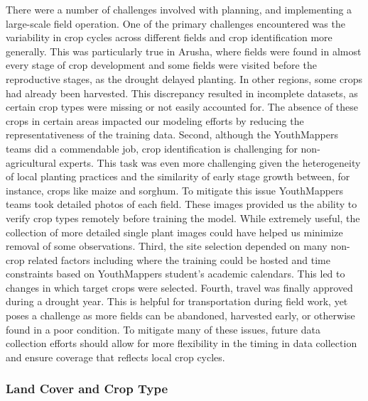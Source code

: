 \documentclass[
  journal,
  twocolumn]{IEEEtran}
\begin{document}
There were a number of challenges involved with planning, and
implementing a large-scale field operation. One of the primary
challenges encountered was the variability in crop cycles across
different fields and crop identification more generally. This was
particularly true in Arusha, where fields were found in almost every
stage of crop development and some fields were visited before the
reproductive stages, as the drought delayed planting. In other regions,
some crops had already been harvested. This discrepancy resulted in
incomplete datasets, as certain crop types were missing or not easily
accounted for. The absence of these crops in certain areas impacted our
modeling efforts by reducing the representativeness of the training
data. Second, although the YouthMappers teams did a commendable job,
crop identification is challenging for non-agricultural experts. This
task was even more challenging given the heterogeneity of local planting
practices and the similarity of early stage growth between, for
instance, crops like maize and sorghum. To mitigate this issue
YouthMappers teams took detailed photos of each field. These images
provided us the ability to verify crop types remotely before training
the model. While extremely useful, the collection of more detailed
single plant images could have helped us minimize removal of some
observations. Third, the site selection depended on many non-crop
related factors including where the training could be hosted and time
constraints based on YouthMappers student's academic calendars. This led
to changes in which target crops were selected. Fourth, travel was
finally approved during a drought year. This is helpful for
transportation during field work, yet poses a challenge as more fields
can be abandoned, harvested early, or otherwise found in a poor
condition. To mitigate many of these issues, future data collection
efforts should allow for more flexibility in the timing in data
collection and ensure coverage that reflects local crop cycles.

\subsubsection{Land Cover and Crop Type}\label{land-cover-and-crop-type}
\end{document}
